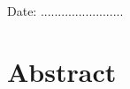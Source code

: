 \documentclass[12pt,a4paper]{article}
\begin{document}
\vspace{1.5cm}
\noindent
Date: ........................

\thispagestyle{plain}





\clearpage
\section*{Abstract}
\end{document}
